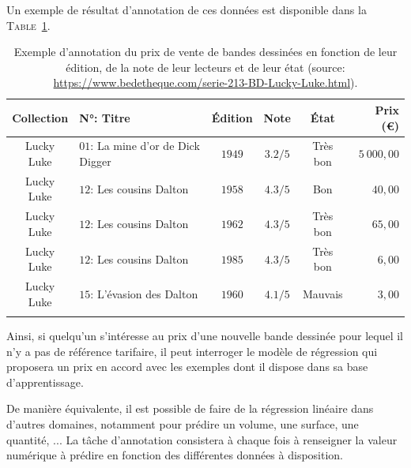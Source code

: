 			Un exemple de résultat d'annotation de ces données est disponible dans la \textsc{Table~\ref{table:2.1.2.A-PRESENTATION-ANNOTATION-EXEMPLES-REGRESSION}}.
			\begin{leftBarExamples}
				\begin{table}[H]  %
					\begin{center}
					\def\arraystretch{0.8}  %
					\begin{tabular}{|c|l|c|c|c|r|}
					
					\hline
					Collection
						& N°: Titre
						& Édition
						& Note
						& État
						& Prix (€)
						\tabularnewline
						\hline
					Lucky Luke
						& $01$: La mine d'or de Dick Digger
						& $1949$
						& $3.2/5$
						& Très bon
						& $5~000,00$
						\tabularnewline
						\hline
					Lucky Luke
						& $12$: Les cousins Dalton
						& $1958$
						& $4.3/5$
						& Bon
						& $40,00$
						\tabularnewline
						\hline
					Lucky Luke
						& $12$: Les cousins Dalton
						& $1962$
						& $4.3/5$
						& Très bon
						& $65,00$
						\tabularnewline
						\hline
					Lucky Luke
						& $12$: Les cousins Dalton
						& $1985$
						& $4.3/5$
						& Très bon
						& $6,00$
						\tabularnewline
						\hline
					Lucky Luke
						& $15$: L'évasion des Dalton
						& $1960$
						& $4.1/5$
						& Mauvais
						& $3,00$
						\tabularnewline
						\hline
					\multicolumn{6}{|c|}{ \shortstack{ ... } }
						\tabularnewline
						\hline
				
					\end{tabular}
					\end{center}
					\caption{
						Exemple d'annotation du prix de vente de bandes dessinées en fonction de leur édition, de la note de leur lecteurs et de leur état (source: \url{https://www.bedetheque.com/serie-213-BD-Lucky-Luke.html}).
					}
					\label{table:2.1.2.A-PRESENTATION-ANNOTATION-EXEMPLES-REGRESSION}
				\end{table}
			\end{leftBarExamples}
			
			Ainsi, si quelqu'un s'intéresse au prix d'une nouvelle bande dessinée pour lequel il n'y a pas de référence tarifaire, il peut interroger le modèle de régression qui proposera un prix en accord avec les exemples dont il dispose dans sa base d'apprentissage.
			
			\begin{leftBarInformation}
				De manière équivalente, il est possible de faire de la régression linéaire dans d'autres domaines, notamment pour prédire un volume, une surface, une quantité, ...
				La tâche d'annotation consistera à chaque fois à renseigner la valeur numérique à prédire en fonction des différentes données à disposition.
			\end{leftBarInformation}
		
